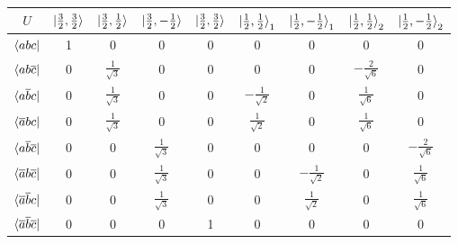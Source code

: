 \documentclass[12pt]{report}
\numberwithin{equation}{section}
\begin{document}
\begin{center}
    \begin{tabular}{c | c c c c c c c c}
        $U$ & $\ket{\frac{3}{2},\frac{3}{2}}$ & $\ket{\frac{3}{2},\frac{1}{2}}$ & $\ket{\frac{3}{2},-\frac{1}{2}}$ & $\ket{\frac{3}{2},\frac{3}{2}}$ & $\ket{\frac{1}{2},\frac{1}{2}}_1$ & $\ket{\frac{1}{2},-\frac{1}{2}}_1$ & $\ket{\frac{1}{2},\frac{1}{2}}_2$ & $\ket{\frac{1}{2},-\frac{1}{2}}_2$\\
        \hline
        $\bra{abc}$ &  1 & 0 & 0 & 0 & 0 & 0 & 0 &0  \\
        $\bra{ab\overline{c}}$ &  0 & $\frac{1}{\sqrt{3}}$ & 0 & 0 & 0 &  0& $-\frac{2}{\sqrt{6}}$ &0   \\
        $\bra{a\overline{b}c}$ & 0 &  $\frac{1}{\sqrt{3}}$& 0 & 0 & $-\frac{1}{\sqrt{2}}$ & 0 & $\frac{1}{\sqrt{6}}$ & 0 \\
        $\bra{\overline{a}bc}$ &  0 & $\frac{1}{\sqrt{3}}$ &  0&  0 &  $\frac{1}{\sqrt{2}}$& 0& $\frac{1}{\sqrt{6}}$ & 0  \\
        $\bra{a\overline{b}\overline{c}}$ & 0 & 0 & $\frac{1}{\sqrt{3}}$ &0  & 0 &0 &0 & $-\frac{2}{\sqrt{6}}$  \\
        $\bra{\overline{a}b\overline{c}}$ &  0 & 0 & $\frac{1}{\sqrt{3}}$ & 0 & 0 & $-\frac{1}{\sqrt{2}}$ & 0 & $\frac{1}{\sqrt{6}}$ \\
        $\bra{\overline{a}\overline{b}c}$ &  0  & 0 & $\frac{1}{\sqrt{3}}$ & 0 & 0 & $\frac{1}{\sqrt{2}}$ &0  & $\frac{1}{\sqrt{6}}$ \\
        $\bra{\overline{a}\overline{b}\overline{c}}$ & 0 &0 & 0 & 1 & 0 & 0 & 0 & 0  
    \end{tabular}
\end{center}
\end{document}

